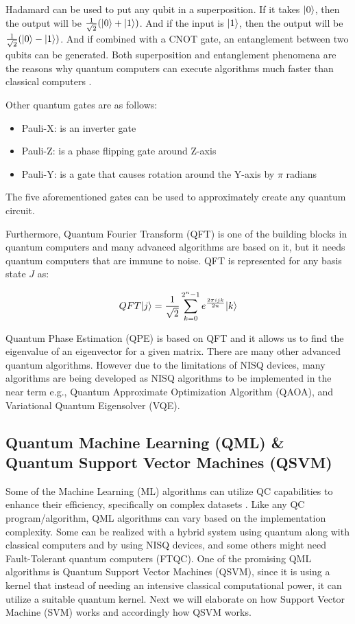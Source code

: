 \documentclass[12pt,a4paper]{article}
\DeclarePairedDelimiter\ket{\lvert}{\rangle}
\begin{document}
	Hadamard can be used to put any qubit in a superposition. If it takes $\ket{0}$, then the output will be 
	$\frac{1}{\sqrt{2}} (\ket{0} +\ket{1})$. And if the input is $\ket{1}$, then the output will be $\frac{1}{\sqrt{2}} (\ket{0} -\ket{1})$. And if combined with a CNOT gate, an entanglement between two qubits can be generated. Both superposition and entanglement phenomena are the reasons why quantum computers can execute algorithms much faster than classical computers \cite{9357505}.
	
	Other quantum gates are as follows:
	\begin{itemize}
		\item Pauli-X: is an inverter gate
		\item Pauli-Z: is a phase flipping gate around Z-axis
		\item Pauli-Y: is a gate that causes rotation around the Y-axis by $\pi$ radians
	\end{itemize}
	The five aforementioned gates can be used to approximately create any quantum circuit. 
	
	Furthermore, Quantum Fourier Transform (QFT) is one of the building blocks in quantum computers and many advanced algorithms are based on it, but it needs quantum computers that are immune to noise. QFT is represented for any basis state $J$ as:
	
	\begin{equation}
		\label{eqn:equation2}
		QFT\ket{j} =  \frac{1}{\sqrt{2}} \sum_{k=0}^{2^n-1} e^\frac{2\pi ijk}{2n} \ket{k}
	\end{equation}
	
	Quantum Phase Estimation (QPE) is based on QFT and it allows us to find the eigenvalue of an eigenvector for a given matrix. There are many other advanced quantum algorithms. However due to the limitations of NISQ devices, many algorithms are being developed as NISQ algorithms to be implemented in the near term e.g., Quantum Approximate Optimization Algorithm (QAOA), and Variational Quantum Eigensolver (VQE). 
	
	\subsection{Quantum Machine Learning (QML) \& Quantum Support Vector Machines (QSVM) }
	
	Some of the Machine Learning (ML) algorithms can utilize QC capabilities to enhance their efficiency, specifically on complex datasets \cite{electronics12112379} \cite{maouaki2024quantumsupportvectormachine}. Like any QC program/algorithm, QML algorithms can vary based on the implementation complexity. Some can be realized with a hybrid system using quantum along with classical computers and by using NISQ devices, and some others might need Fault-Tolerant quantum computers (FTQC). One of the promising QML algorithms is Quantum Support Vector Machines (QSVM), since it is using a kernel that instead of needing an intensive classical computational power, it can utilize a suitable quantum kernel. Next we will elaborate on how Support Vector Machine (SVM) works and accordingly how QSVM works.
	
\end{document}
